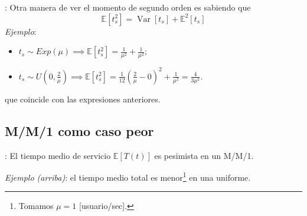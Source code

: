 \documentclass[xcolor={x11names}]{beamer}
\DeclareMathOperator{\Var}{Var}
\begin{document}
\begin{frame}{\secname: \subsecname}
    Otra manera de ver el momento de
    segundo orden es sabiendo que
    \begin{equation*}
        \mathbb{E}[t_s^2]=\Var[t_s]+
        \mathbb{E}^2[t_s]
    \end{equation*}
    \vfill
    \textit{Ejemplo}:
    \begin{itemize}
        \item $t_s\sim Exp(\mu)\implies
            \mathbb{E}[t_s^2]=\frac{1}{\mu^2}+
            \frac{1}{\mu^2}$;
        \item $t_s\sim U\left(0,\tfrac{2}{\mu}
            \right)
            \implies
            \mathbb{E}[t_s^2]=\frac{1}{12}
            \left(\frac{2}{\mu}-0\right)^2+
            \frac{1}{\mu^2}
            =\frac{4}{3\mu^2}$.
    \end{itemize}
    que coincide con las expresiones anteriores.
\end{frame}


\subsection{M/M/1 como caso peor}
\begin{frame}{\secname: \subsecname}
    El tiempo medio de servicio
    $\mathbb{E}[T(t)]$
    es pesimista en un M/M/1.

    \vfill


    \begin{figure}
        
    \end{figure}
    \textit{Ejemplo (arriba)}: el tiempo medio
    total es menor\footnote{
        Tomamos $\mu=1$
    [usuario/sec].} en una
    uniforme.


\end{frame}






\end{document}
